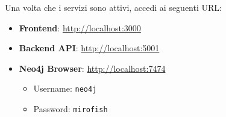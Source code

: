 Una volta che i servizi sono attivi, accedi ai seguenti URL:

\begin{itemize}
    \item \textbf{Frontend}: \href{http://localhost:3000}{http://localhost:3000}
    \item \textbf{Backend API}: \href{http://localhost:5001}{http://localhost:5001}
    \item \textbf{Neo4j Browser}: \href{http://localhost:7474}{http://localhost:7474}
    \begin{itemize}
        \item Username: \texttt{neo4j}
        \item Password: \texttt{mirofish}
    \end{itemize}
\end{itemize}
